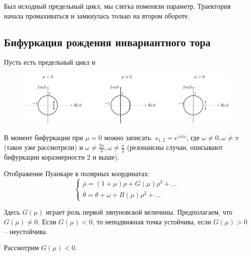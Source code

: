 Был исходный предельный цикл, мы слегка поменяли параметр. Траектория начала промахиваться и замкнулась только на втором обороте. 

\subsection{Бифуркация рождения инвариантного тора}
Пусть есть предельный цикл и
\begin{figure}[H]
	\centering
	\includegraphics[width=1\linewidth]{fig/fig71.pdf}   
\end{figure}
В момент бифуркации при $\mu=0$ можно записать: $s_{1,2}=e^{\pm i\omega}$, где $\omega \neq 0,\omega \neq \pi$ (такое уже рассмотрели) и $\omega \neq \frac{2\pi}{3},\omega \neq \frac{\pi}{2}$ (резонансны случаи, описывают бифуркации коразмерности 2 и выше).

Отображение Пуанкаре в полярных координатах:
\begin{equation}
	\begin{cases}
		\stackrel{\_}{\rho}= (1+\mu)\rho+G(\mu)\rho^3+\dots \\
		\stackrel{\_}{\theta}= \theta+\omega+B(\mu)\rho^2+\dots
	\end{cases}
	\label{eq:s9:4}	
\end{equation}

Здесь $G(\mu)$ играет роль первой ляпуновской величины. Предполагаем, что $G(\mu)\neq 0$. Если $G(\mu)< 0$, то неподвижная точка устойчива, если $G(\mu)> 0$ -- неустойчива. 

Рассмотрим $G(\mu)< 0$. 

